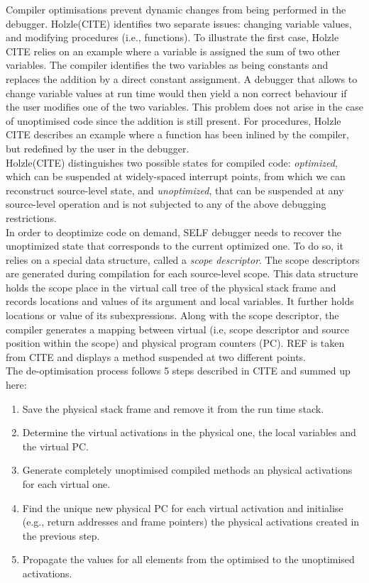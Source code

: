 Compiler optimisations prevent dynamic changes from being performed in the debugger.
Holzle(CITE) identifies two separate issues: changing variable values, and modifying procedures (i.e., functions).
To illustrate the first case, Holzle CITE relies on an example where a variable is assigned the sum of two other variables.
The compiler identifies the two variables as being constants and replaces the addition by a direct constant assignment.
A debugger that allows to change variable values at run time would then yield a non correct behaviour if the user modifies one of the two variables. 
This problem does not arise in the case of unoptimised code since the addition is still present. 
For procedures, Holzle CITE describes an example where a function has been inlined by the compiler, but redefined by the user in the debugger.\\

Holzle(CITE) distinguishes two possible states for compiled code: \textit{optimized}, which can be suspended at widely-spaced interrupt points, from which we can reconstruct source-level state, and \textit{unoptimized}, that can be suspended at any source-level operation and is not subjected to any of the above debugging restrictions.\\

In order to deoptimize code on demand, SELF debugger needs to recover the unoptimized state that corresponds to the current optimized one. 
To do so, it relies on a special data structure, called a \textit{scope descriptor}. 
The scope descriptors are generated during compilation for each source-level scope. 
This data structure holds the scope place in the virtual call tree of the physical stack frame and records locations and values of its argument and local variables. 
It further holds locations or value of its subexpressions. Along with the scope descriptor, the compiler generates a mapping between virtual (i.e, scope descriptor and source position within the scope) and physical program counters (PC). REF is taken from CITE and displays a method suspended at two different points.\\

The de-optimisation process follows 5 steps described in CITE and summed up here:
\begin{enumerate}
    \item Save the physical stack frame and remove it from the run time stack.
    \item Determine the virtual activations in the physical one, the local variables and the virtual PC.
    \item Generate completely unoptimised compiled methods an physical activations for each virtual one.
    \item Find the unique new physical PC for each virtual activation and initialise (e.g., return addresses and frame pointers) the physical activations created in the previous step.
    \item Propagate the values for all elements from the optimised to the unoptimised activations.
\end{enumerate}
 






